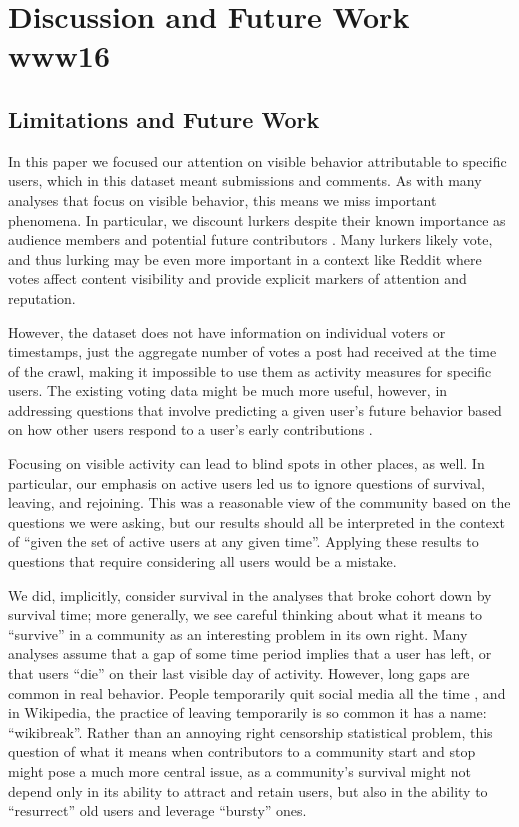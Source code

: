 \section{Discussion and Future Work www16}

\subsection{Limitations and Future Work}

In this paper we focused our attention on visible behavior attributable to specific users, which in this dataset meant submissions and comments.  As with many analyses that focus on visible behavior, this means we miss important phenomena.  In particular, we discount lurkers despite their known importance as audience members \cite{Nonnecke2003} and potential future contributors \cite{Ridings2006}.  Many lurkers likely vote, and thus lurking may be even more important in a context like Reddit where votes affect content visibility and provide explicit markers of attention and reputation.  

However, the dataset does not have information on individual voters or timestamps, just the aggregate number of votes a post had received at the time of the crawl, making it impossible to use them as activity measures for specific users.  The existing voting data might be much more useful, however, in addressing questions that involve predicting a given user's future behavior based on how other users respond to a user's early contributions \cite{Joyce2006,Sarkar2012}.

Focusing on visible activity can lead to blind spots in other places, as well.  In particular, our emphasis on active users led us to ignore questions of survival, leaving, and rejoining.  This was a reasonable view of the community based on the questions we were asking, but our results should all be interpreted in the context of ``given the set of active users at any given time''.  Applying these results to questions that require considering all users would be a mistake.  

We did, implicitly, consider survival in the analyses that broke cohort down by survival time; more generally, we see careful thinking about what it means to ``survive'' in a community as an interesting problem in its own right.  Many analyses assume that a gap of some time period implies that a user has left, or that users ``die'' on their last visible day of activity.  However, long gaps are common in real behavior.  People temporarily quit social media all the time \cite{Baumer2013}, and in Wikipedia, the practice of leaving temporarily is so common it has a name: ``wikibreak''.    Rather than an annoying right censorship statistical problem, this question of what it means when contributors to a community start and stop might pose a much more central issue, as a community's survival might not depend only in its ability to attract and retain users, but also in the ability to ``resurrect'' old users and leverage ``bursty'' ones.

